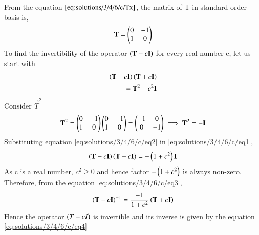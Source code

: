 From the equation $\eqref{eq:solutions/3/4/6/c/Tx}$, the matrix of T in standard order basis is,
\begin{align}
\mathbf{T}=\begin{pmatrix}0&-1\\1&0\end{pmatrix}\label{eq:solutions/3/4/6/c/matT}
\end{align}
To find the invertibility of the operator $\left(\mathbf{T}-c\mathbf{I}\right)$ for every real number c, let us start with
\begin{align}
\left(\mathbf{T}-c\mathbf{I}\right)\left(\mathbf{T}+c\mathbf{I}\right)\\
=\mathbf{T}^2-c^2\mathbf{I}\label{eq:solutions/3/4/6/c/eq1}
\end{align}
Consider $\vec{T}^2$
\begin{align}
\mathbf{T}^2=\begin{pmatrix}0&-1\\1&0\end{pmatrix}\begin{pmatrix}0&-1\\1&0\end{pmatrix}=\begin{pmatrix}-1&0\\0&-1\end{pmatrix}
\implies \mathbf{T}^2=-\mathbf{I}\label{eq:solutions/3/4/6/c/eq2}
\end{align}
Substituting equation \eqref{eq:solutions/3/4/6/c/eq2} in \eqref{eq:solutions/3/4/6/c/eq1}, 
\begin{align}
\left(\mathbf{T}-c\mathbf{I}\right)\left(\mathbf{T}+c\mathbf{I}\right)=-\left(1+c^2\right)\mathbf{I}\label{eq:solutions/3/4/6/c/eq3}
\end{align}
As c is a real number, $c^2\ge0$ and hence factor $-\left(1+c^2\right)$ is always non-zero. Therefore, from the equation \eqref{eq:solutions/3/4/6/c/eq3},
\begin{align}
\left(\mathbf{T}-c\mathbf{I}\right)^{-1}=\frac{-1}{1+c^2}\left(\mathbf{T}+c\mathbf{I}\right)\label{eq:solutions/3/4/6/c/eq4}
\end{align}
Hence the operator $\left(T-cI\right)$ is invertible and its inverse is given by the equation \eqref{eq:solutions/3/4/6/c/eq4}

